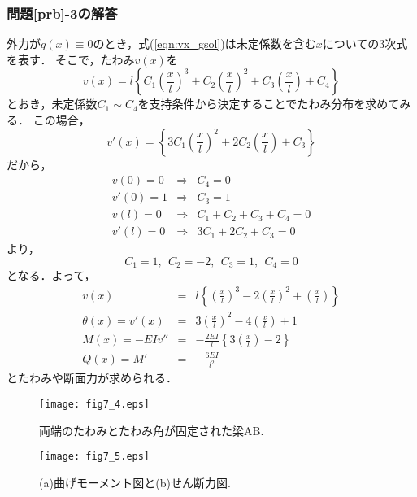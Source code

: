 \documentclass[10pt,a4j]{jbook}
\begin{document}
\subsubsection*{問題\ref{prb}-3の解答}
外力が$q(x) \equiv 0$のとき，式(\ref{eqn:vx_gsol})は未定係数を含む$x$についての3次式を表す．
そこで，たわみ$v(x)$を
\begin{equation}
	v(x)= l\left\{ 
		C_1\left(\frac{x}{l}\right)^3
		+
		C_2\left(\frac{x}{l}\right)^2
		+
		C_3\left(\frac{x}{l}\right)
		+
		C_4
	\right\}
\end{equation}
とおき，未定係数$C_1\sim C_4$を支持条件から決定することでたわみ分布を求めてみる．
この場合，
\begin{equation}
	v'(x)=\left\{ 
		3C_1\left(\frac{x}{l}\right)^2
		+
		2C_2\left(\frac{x}{l}\right)
		+
		C_3
	\right\}
\end{equation}
だから，
\begin{eqnarray}
	v(0)=0 & \Rightarrow & C_4=0 \\
	v'(0)=1 & \Rightarrow & C_3=1 \\
	v(l)=0 & \Rightarrow & C_1+C_2+C_3+C_4=0 \\
	v'(l)=0 & \Rightarrow & 3C_1+2C_2+C_3=0
\end{eqnarray}
より，
\begin{equation}
	C_1=1, \ \ C_2=-2, \ \ C_3=1, \ \ C_4=0
\end{equation}
となる．よって，
\begin{eqnarray}
	v(x) &=& l\left\{ 
		\left(\frac{x}{l}\right)^3
		-
		2\left(\frac{x}{l}\right)^2
		+
		\left(\frac{x}{l}\right)
	\right\}
	\\
	\theta(x)=v'(x) & =& 
	3\left(\frac{x}{l}\right)^2
	-
	4\left(\frac{x}{l}\right)
	+
	1
	\\
	M(x)=-EIv'' &=& -\frac{2EI}{l} \left\{ 3\left(\frac{x}{l}\right)-2\right\}
	\\
	Q(x)=M' &=& -\frac{6EI}{l^2}
\end{eqnarray}
とたわみや断面力が求められる．
\begin{figure}
	\begin{center}
	\texttt{[image: fig7\_4.eps]} 
	\end{center}
	\caption{両端のたわみとたわみ角が固定された梁AB.} 
	\label{fig:fig7_4}
\end{figure}
\begin{figure}
	\begin{center}
	\texttt{[image: fig7\_5.eps]} 
	\end{center}
	\caption{(a)曲げモーメント図と(b)せん断力図.} 
	\label{fig:fig7_5}
\end{figure}
\end{document}

